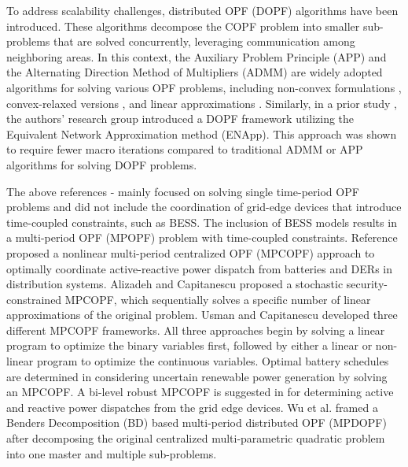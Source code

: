 \documentclass{article}
\begin{document}
To address scalability challenges, distributed OPF (DOPF) algorithms have been introduced. These algorithms decompose the COPF problem into smaller sub-problems that are solved concurrently, leveraging communication among neighboring areas. In this context, the Auxiliary Problem Principle (APP) and the Alternating Direction Method of Multipliers (ADMM) are widely adopted algorithms for solving various OPF problems, including non-convex formulations \cite{Fazio}, convex-relaxed versions \cite{Zheng, Wang, Biswas}, and linear approximations \cite{Paul2}. Similarly, in a prior study \cite{Sadnan}, the authors' research group introduced a DOPF framework utilizing the Equivalent Network Approximation method (ENApp). This approach was shown to require fewer macro iterations compared to traditional ADMM or APP algorithms for solving DOPF problems.



The above references \cite{Wei}-\cite{Paul2} mainly focused on solving single time-period OPF problems and did not include the coordination of grid-edge devices that introduce time-coupled constraints, such as BESS. The inclusion of BESS models results in a multi-period OPF (MPOPF) problem with time-coupled constraints. Reference \cite{Gabash} proposed a nonlinear multi-period centralized OPF (MPCOPF) approach to optimally coordinate  active-reactive power dispatch from batteries and DERs in distribution systems. Alizadeh and Capitanescu \cite{Alizadeh} proposed a stochastic security-constrained MPCOPF, which sequentially solves a specific number of linear approximations of the original problem. Usman and Capitanescu \cite{Usman} developed three different MPCOPF frameworks. All three approaches begin by solving a linear program to optimize the binary variables first, followed by either a linear or non-linear program to optimize the continuous variables. Optimal battery schedules are determined in \cite{Aghdam} considering uncertain renewable power generation by solving an MPCOPF. A bi-level robust MPCOPF is suggested in \cite{Zhang1} for determining active and reactive power dispatches from the grid edge devices. Wu et al. \cite{Wu} framed a Benders Decomposition (BD) based multi-period distributed OPF (MPDOPF) after decomposing the original centralized multi-parametric quadratic problem into one master and multiple sub-problems. 
\end{document}
